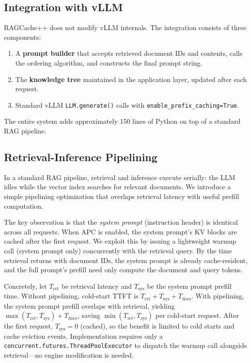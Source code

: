 \documentclass{article}
\begin{document}
\subsection{Integration with vLLM}

RAGCache++ does not modify vLLM internals. The integration consists of three components:
\begin{enumerate}
\item A \textbf{prompt builder} that accepts retrieved document IDs and contents, calls the ordering algorithm, and constructs the final prompt string.
\item The \textbf{knowledge tree} maintained in the application layer, updated after each request.
\item Standard vLLM \texttt{LLM.generate()} calls with \texttt{enable\_prefix\_caching=True}.
\end{enumerate}
The entire system adds approximately 150 lines of Python on top of a standard RAG pipeline.

\subsection{Retrieval-Inference Pipelining}

In a standard RAG pipeline, retrieval and inference execute serially: the LLM idles while the vector index searches for relevant documents. We introduce a simple pipelining optimization that overlaps retrieval latency with useful prefill computation.

The key observation is that the \emph{system prompt} (instruction header) is identical across all requests. When APC is enabled, the system prompt's KV blocks are cached after the first request. We exploit this by issuing a lightweight warmup call (system prompt only) concurrently with the retrieval query. By the time retrieval returns with document IDs, the system prompt is already cache-resident, and the full prompt's prefill need only compute the document and query tokens.

Concretely, let $T_{\text{ret}}$ be retrieval latency and $T_{\text{sys}}$ be the system prompt prefill time. Without pipelining, cold-start TTFT is $T_{\text{ret}} + T_{\text{sys}} + T_{\text{docs}}$. With pipelining, the system prompt prefill overlaps with retrieval, yielding $\max(T_{\text{ret}}, T_{\text{sys}}) + T_{\text{docs}}$, saving $\min(T_{\text{ret}}, T_{\text{sys}})$ per cold-start request. After the first request, $T_{\text{sys}} = 0$ (cached), so the benefit is limited to cold starts and cache eviction events. Implementation requires only a \texttt{concurrent.futures.ThreadPoolExecutor} to dispatch the warmup call alongside retrieval---no engine modification is needed.
\end{document}
